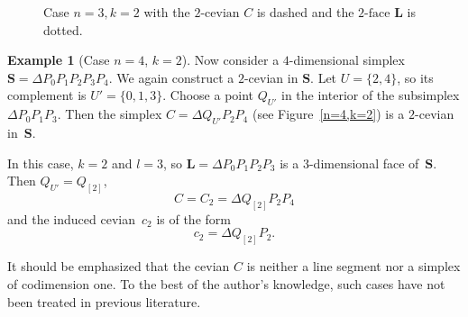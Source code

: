 \documentclass[12pt, reqno]{amsart}
\theoremstyle{definition}
\newtheorem{example}[theorem]{Example}
\theoremstyle{remark}
\numberwithin{equation}{section}
\begin{document}
{\begin{figure}
\caption{\label{n=3,k=2}Case $n=3, k=2$ with the $2\mbox{-cevian } C$ is dashed and the $2\mbox{-face } \mathbf{L}$ is dotted.}  
\end{figure}



\begin{example}[Case $n=4$, $k=2$]
Now consider a $4$-dimensional simplex $\mathbf{S} = \Delta P_0P_1P_2P_3P_4$. We again construct a $2$-cevian in $\mathbf{S}$. Let $U=\{2,4\}$, so its complement is $U' = \{0,1,3\}$. Choose a point $Q_{U'}$ in the interior of the subsimplex $\Delta P_0P_1P_3$. Then the simplex $C=\Delta Q_{U'}P_2P_4$ (see Figure~\ref{n=4,k=2}) is a $2$-cevian in~$\mathbf{S}$.

In this case, $k=2$ and $l=3$, so $\mathbf{L}=\Delta P_0P_1P_2P_3$ is a $3$-dimensional face of~$\mathbf{S}$. Then $Q_{U'}=Q_{[2]}$,
\[
    C=C_2=\Delta Q_{[2]}P_2P_4
\]
and the induced cevian~$c_2$ is of the form  
\[
c_2 = \Delta Q_{[2]} P_2. %
\]

It should be emphasized that the cevian $C$ is neither a line segment nor a simplex of codimension one. To the best of the author's knowledge, such cases have not been treated in previous literature.
\end{example}

\begin{figure}
\centering
{} %
\end{figure}}
\end{document}
